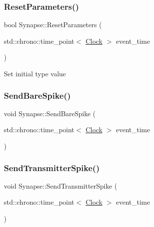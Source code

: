 \mbox{\label{classSynapse_a5b2bbc3553e92492a5c38d1d797fcd92}} 
\subsubsection{\texorpdfstring{Reset\+Parameters()}{ResetParameters()}}
{\footnotesize\ttfamily bool Synapse\+::\+Reset\+Parameters (\begin{DoxyParamCaption}\item[{std\+::chrono\+::time\+\_\+point$<$ \mbox{\hyperlink{universe_8h_a0ef8d951d1ca5ab3cfaf7ab4c7a6fd80}{Clock}} $>$}]{event\+\_\+time }\end{DoxyParamCaption})}

Set initial type value \mbox{\label{classSynapse_a0e28e56ecea170443fdd9722622da6b9}} 
\subsubsection{\texorpdfstring{Send\+Bare\+Spike()}{SendBareSpike()}}
{\footnotesize\ttfamily void Synapse\+::\+Send\+Bare\+Spike (\begin{DoxyParamCaption}\item[{std\+::chrono\+::time\+\_\+point$<$ \mbox{\hyperlink{universe_8h_a0ef8d951d1ca5ab3cfaf7ab4c7a6fd80}{Clock}} $>$}]{event\+\_\+time }\end{DoxyParamCaption})}

\mbox{\label{classSynapse_a4147d3bea8f21918f88bea334f9c4abc}} 
\subsubsection{\texorpdfstring{Send\+Transmitter\+Spike()}{SendTransmitterSpike()}}
{\footnotesize\ttfamily void Synapse\+::\+Send\+Transmitter\+Spike (\begin{DoxyParamCaption}\item[{std\+::chrono\+::time\+\_\+point$<$ \mbox{\hyperlink{universe_8h_a0ef8d951d1ca5ab3cfaf7ab4c7a6fd80}{Clock}} $>$}]{event\+\_\+time }\end{DoxyParamCaption})}


